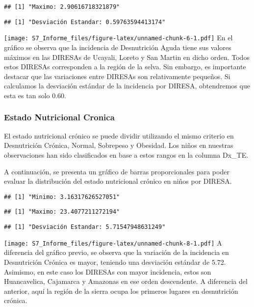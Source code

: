 \documentclass[
]{article}
\begin{document}
\begin{verbatim}
## [1] "Maximo: 2.90616718321879"
\end{verbatim}

\begin{verbatim}
## [1] "Desviación Estandar: 0.59763594413174"
\end{verbatim}

\texttt{[image: S7\_Informe\_files/figure-latex/unnamed-chunk-6-1.pdf]} En
el gráfico se observa que la incidencia de Desnutrición Aguda tiene sus
valores máximos en las DIRESAs de Ucayali, Loreto y San Martin en dicho
orden. Todos estos DIRESAs corresponden a la región de la selva. Sin
embargo, es importante destacar que las variaciones entre DIRESAs son
relativamente pequeños. Si calculamos la desviación estándar de la
incidencia por DIRESA, obtendremos que esta es tan solo 0.60.

\hypertarget{estado-nutricional-cronica}{%
\subsubsection{Estado Nutricional
Cronica}\label{estado-nutricional-cronica}}

El estado nutricional crónico se puede dividir utilizando el mismo
criterio en Desnutrición Crónica, Normal, Sobrepeso y Obesidad. Los
niños en nuestras observaciones han sido clasificados en base a estos
rangos en la columna Dx\_TE.

A continuación, se presenta un gráfico de barras proporcionales para
poder evaluar la distribución del estado nutricional crónico en niños
por DIRESA.

\begin{verbatim}
## [1] "Minimo: 3.16317626527051"
\end{verbatim}

\begin{verbatim}
## [1] "Maximo: 23.4077211272194"
\end{verbatim}

\begin{verbatim}
## [1] "Desviación Estandar: 5.71547948631249"
\end{verbatim}

\texttt{[image: S7\_Informe\_files/figure-latex/unnamed-chunk-8-1.pdf]} A
diferencia del gráfico previo, se observa que la variación de la
incidencia en Desnutrición Crónica es mayor, teniendo una desviación
estándar de 5.72. Asimismo, en este caso los DIRESAs con mayor
incidencia, estos son Huancavelica, Cajamarca y Amazonas en ese orden
descendente. A diferencia del anterior, aquí la región de la sierra
ocupa los primeros lugares en desnutrición crónica.
\end{document}
